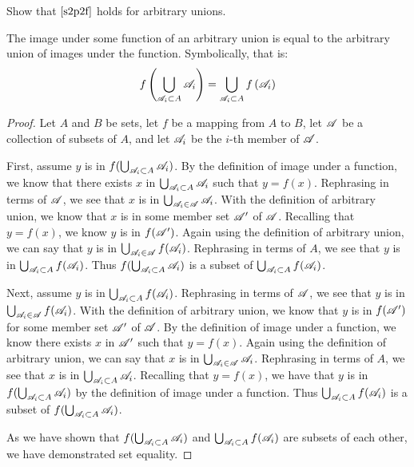 \documentclass[main.tex]{subfiles}
\begin{document}
\subproblem{}\label{s2p3c}

Show that \(\ref{s2p2f}\) holds for arbitrary unions.
\begin{thm}
	The image under some function of an arbitrary union is equal to the
	arbitrary union of images under the function. Symbolically, that is:
	\[f\left(\bigcup\limits_{\mathscr{A}_i \subset A} {\mathscr{A}_i}\right) = \bigcup\limits_{\mathscr{A}_i \subset A} {f\left(\mathscr{A}_i\right)}\]
\end{thm}
\begin{proof}
	Let \(A\) and \(B\) be sets, let \(f\) be a mapping from \(A\) to \(B\),
	let \(\mathscr{A}\) be a collection of subsets of \(A\), and let
	\(\mathscr{A}_i\) be the \(i\)-th member of \(\mathscr{A}\).

	First, assume \(y\) is in
	\(f(\bigcup_{\mathscr{A}_i \subset A} {\mathscr{A}_i})\). By the
	definition of image under a function, we know that there exists \(x\) in
	\(\bigcup_{\mathscr{A}_i \subset A} {\mathscr{A}_i}\) such that
	\(y = f(x)\). Rephrasing in terms of \(\mathscr{A}\), we see that \(x\)
	is in \(\bigcup_{\mathscr{A}_i \in \mathscr{A}} {\mathscr{A}_i}\).
	With the definition of arbitrary union, we know that \(x\) is in some
	member set \(\mathscr{A}'\) of \(\mathscr{A}\). Recalling that
	\(y = f(x)\), we know \(y\) is in \(f(\mathscr{A}')\). Again using the
	definition of arbitrary union, we can say that \(y\) is in
	\(\bigcup_{\mathscr{A}_i \in \mathscr{A}} {f(\mathscr{A}_i)}\).
	Rephrasing in terms of \(A\), we see that \(y\) is in
	\(\bigcup_{\mathscr{A}_i \subset A} {f(\mathscr{A}_i)}\). Thus
	\(f(\bigcup_{\mathscr{A}_i \subset A} {\mathscr{A}_i})\) is a
	subset of
	\(\bigcup_{\mathscr{A}_i \subset A} {f(\mathscr{A}_i)}\).

	Next, assume \(y\) is in
	\(\bigcup_{\mathscr{A}_i \subset A} {f(\mathscr{A}_i)}\).
	Rephrasing in terms of \(\mathscr{A}\), we see that \(y\) is in
	\(\bigcup_{\mathscr{A}_i \in \mathscr{A}} {f(\mathscr{A}_i)}\).
	With the definition of arbitrary union, we know that \(y\) is in
	\(f(\mathscr{A}')\) for some member set \(\mathscr{A}'\) of
	\(\mathscr{A}\). By the definition of image under a function, we know
	there exists \(x\) in \(\mathscr{A}'\) such that \(y = f(x)\). Again
	using the definition of arbitrary union, we can say that \(x\) is in
	\(\bigcup_{\mathscr{A}_i \in \mathscr{A}} {\mathscr{A}_i}\).
	Rephrasing in terms of \(A\), we see that \(x\) is in
	\(\bigcup_{\mathscr{A}_i \subset A} {\mathscr{A}_i}\). Recalling
	that \(y = f(x)\), we have that \(y\) is in
	\(f(\bigcup_{\mathscr{A}_i \subset A} {\mathscr{A}_i})\) by the
	definition of image under a function. Thus
	\(\bigcup_{\mathscr{A}_i \subset A} {f(\mathscr{A}_i)}\) is a
	subset of
	\(f(\bigcup_{\mathscr{A}_i \subset A} {\mathscr{A}_i})\).

	As we have shown that
	\(f(\bigcup_{\mathscr{A}_i \subset A} {\mathscr{A}_i})\) and
	\(\bigcup_{\mathscr{A}_i \subset A} {f(\mathscr{A}_i)}\) are
	subsets of each other, we have demonstrated set equality.
\end{proof}
\end{document}
